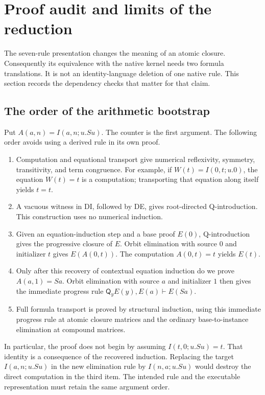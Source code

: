 \documentclass[11pt,a4paper]{article}
\theoremstyle{definition}
\begin{document}

\section{Proof audit and limits of the reduction}
\label{sec:proof-audit}

The seven-rule presentation changes the meaning of an atomic closure.
Consequently its equivalence with the native kernel needs two formula
translations.  It is not an identity-language deletion of one native rule.
This section records the dependency checks that matter for that claim.

\subsection{The order of the arithmetic bootstrap}

Put $A(a,n)=I(a,n;u.Su)$.  The counter is the first argument.
The following order avoids using a derived rule in its own proof.
\begin{enumerate}
\item Computation and equational transport give numerical reflexivity,
      symmetry, transitivity, and term congruence.  For example, if
      $W(t)=I(0,t;u.0)$, the equation $W(t)=t$ is a computation;
      transporting that equation along itself yields $t=t$.
\item A vacuous witness in DI, followed by DE, gives root-directed
      Q-introduction.  This construction uses no numerical induction.
\item Given an equation-induction step and a base proof $E(0)$,
      Q-introduction gives the progressive closure of $E$.  Orbit
      elimination with source $0$ and initializer $t$ gives
      $E(A(0,t))$.  The computation $A(0,t)=t$ yields $E(t)$.
\item Only after this recovery of contextual equation induction do we
      prove $A(a,1)=Sa$.  Orbit elimination with source $a$ and initializer
      $1$ then gives the immediate progress rule
      $\mathsf Q_yE(y),E(a)\vdash E(Sa)$.
\item Full formula transport is proved by structural induction, using
      this immediate progress rule at atomic closure matrices and the
      ordinary base-to-instance elimination at compound matrices.
\end{enumerate}

In particular, the proof does not begin by assuming $I(t,0;u.Su)=t$.
That identity is a consequence of the recovered induction.  Replacing
the target $I(a,n;u.Su)$ in the new elimination rule by
$I(n,a;u.Su)$ would destroy the direct computation in the third item.
The intended rule and the executable representation must retain the
same argument order.
\end{document}
